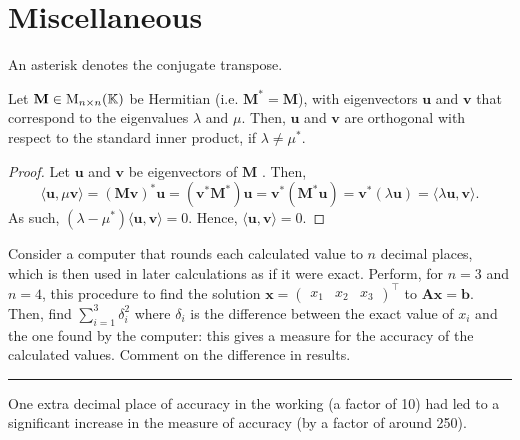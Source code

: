 \section{Miscellaneous}
An asterisk denotes the conjugate transpose.
\begin{theorem}{}{}
    Let \(\mathbf{M}\in\operatorname{M}_{n \times n}(\mathbb{K})\) be Hermitian (i.e. \(\mathbf{M}^{*}=\mathbf{M}\)), with eigenvectors \(\mathbf{u}\) and \(\mathbf{v}\) that correspond to the eigenvalues \(\lambda\) and \(\mu\). Then, \(\mathbf{u}\) and \(\mathbf{v}\) are orthogonal with respect to the standard inner product, if \(\lambda\neq\mu^{*}\). 
\end{theorem}
\begin{proof}
    Let \(\mathbf{u}\) and \(\mathbf{v}\) be eigenvectors of \(\mathbf{M}\) . Then, 
    \[\langle \mathbf{u},\mu\mathbf{v} \rangle=(\mathbf{M} \mathbf{v})^{*}\mathbf{u}=(\mathbf{v}^{*}\mathbf{M}^{*})\mathbf{u}=\mathbf{v}^{*}(\mathbf{M}^{*}\mathbf{u})=\mathbf{v}^{*}(\lambda \mathbf{u})=\langle \lambda \mathbf{u},\mathbf{v} \rangle.\]
    As such, \((\lambda-\mu^{*})\langle \mathbf{u},\mathbf{v} \rangle=0\). Hence, \(\langle \mathbf{u},\mathbf{v} \rangle=0\).
\end{proof}
\begin{example}{}{}
    Consider a computer that rounds each calculated value to \(n\) decimal places, which is then used in later calculations as if it were exact. Perform, for \(n=3\) and \(n=4\), this procedure to find the solution \(\mathbf{x}=
    \begin{pmatrix}
        x_1 & x_2 & x_3
    \end{pmatrix}^\top\) to \(\mathbf{A}\mathbf{x}=\mathbf{b}\). Then, find \(\sum_{i=1}^{3}{\delta_i^2}\) where \(\delta_i\) is the difference between the exact value of \(x_i\) and the one found by the computer: this gives a measure for the accuracy of the calculated values. Comment on the difference in results.

    \rule{20cm-137.0549pt}{0.05mm}

    \vspace{0.5\baselineskip} One extra decimal place of accuracy in the working (a factor of 10) had led to a significant increase in the measure of accuracy (by a factor of around 250). 
\end{example}
\newpage

